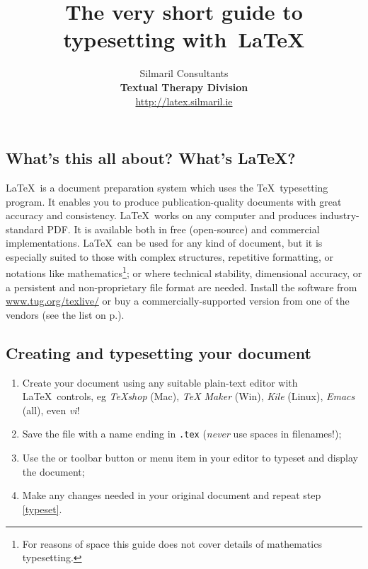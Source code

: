 \documentclass[a5paper]{veryshortguide}
\begin{document}
\title{The very short guide to typesetting with~\LaTeX}
\author{Silmaril Consultants\\
  \textbf{Textual Therapy Division}\\
  \protect\url{http://latex.silmaril.ie}}
\date{\monthdate}
\maketitle
\subsection*{What's this all about? What's \LaTeX?}

\LaTeX\ is a document preparation system which uses the \TeX\ typesetting
program. It enables you to produce publication-quality documents with
great accuracy and consistency. \LaTeX\ works on any computer and
produces industry-standard PDF. It is available both
in free (open-source) and commercial implementations. \LaTeX\ can be
used for any kind of document, but it is especially suited to those
with complex structures, repetitive formatting, or notations like
mathematics\footnote{For reasons of space this guide does not cover
  details of mathematics typesetting.}; or where technical stability,
dimensional accuracy, or a persistent and non-proprietary file format
are needed. Install the software from
\url{www.tug.org/texlive/} or buy a commercially-supported
version from one of the vendors (see the list on p.\thinspace\pageref{comm}).

\subsection*{Creating and typesetting your document}

\begin{enumerate}[noitemsep]\setlength{\fboxsep}{1pt}
   \item Create your document using any suitable plain-text editor
     with \LaTeX\ controls, eg \textit{\TeX shop} (Mac), \textit{\TeX
       Maker} (Win), \textit{Kile} (Linux), \textit{Emacs} (all),
     even \textit{vi}\thinspace!
   \item Save the file with a name ending in \verb+.tex+
     (\emph{never} use spaces in filenames!);
   \item Use the {\small{}} or {\small{}}
     toolbar button or menu item in your editor to typeset and display
     the document;\label{typeset}
   \item Make any changes needed in your original document and repeat
     step \ref{typeset}.
\end{enumerate}
\end{document}
